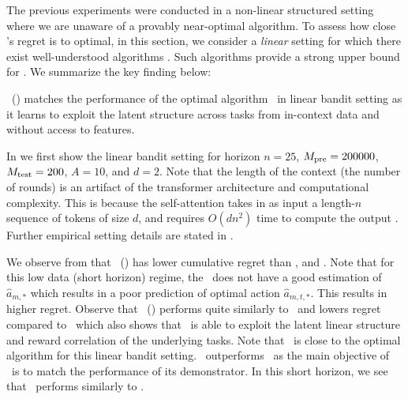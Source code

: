 
The previous experiments were conducted in a non-linear structured setting where we are unaware of a provably near-optimal algorithm.
% 
To assess how close \pred's regret is to optimal, in this section, we consider a \textit{linear} setting for which there exist well-understood algorithms \citep{abbasi2011improved,lattimore2020bandit}.
% 
Such algorithms provide a strong upper bound for \pred. We summarize the key finding below:

\begin{tcolorbox}
\customfinding \pred\ (\gt) matches the performance of the optimal algorithm \linucb\ in linear bandit setting as it learns to exploit the latent structure across tasks from in-context data and without access to features.
\end{tcolorbox}

In  we first show the linear bandit setting for horizon $n=25$, $M_{\text{pre}} = 200000$, $M_{\text{test}} = 200$, $A=10$, and $d=2$. 
%
%
Note that the length of the context (the number of rounds) is an artifact of the transformer architecture and computational complexity. This is because the self-attention takes in as input a length-$n$ sequence of tokens of size $d$, and requires $O\left(d n^2\right)$ time to compute the output \citep{keles2023computational}. 
%
Further empirical setting details are stated in .
%

We observe from   that \pred\ (\gt) has lower cumulative regret than \dptg, and \ad. Note that for this low data (short horizon) regime, the \dptg\ does not have a good estimation of $\widehat{a}_{m,*}$ which results in a poor prediction of optimal action $\widehat{a}_{m,t,*}$. This results in higher regret. Observe that \pred\ (\gt) performs quite similarly to \linucb\ and lowers regret compared to \ts\ which also shows that \pred\ is able to exploit the latent linear structure and reward correlation of the underlying tasks.
%
Note that \linucb\ is close to the optimal algorithm for this linear bandit setting. 
%
\pred\ outperforms \ad\ as the main objective of \ad\ is to match the performance of its demonstrator.
In this short horizon, we see that \mlin\ performs similarly to \linucb. 

